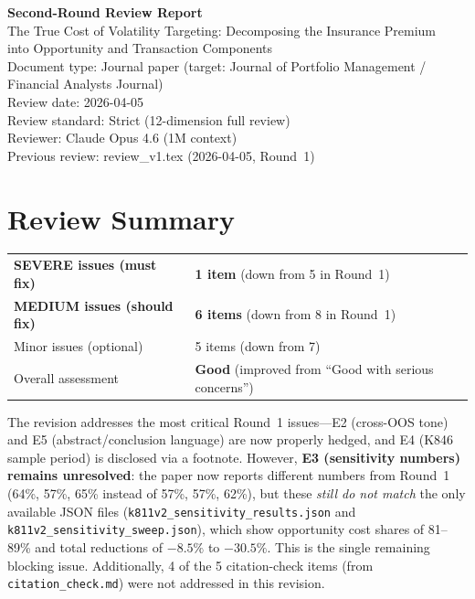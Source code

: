 \documentclass[12pt,a4paper]{article}
\begin{document}
\begin{center}
{\Large\bfseries Second-Round Review Report}\\[0.5em]
{\large The True Cost of Volatility Targeting: Decomposing the Insurance Premium\\into Opportunity and Transaction Components}\\[0.5em]
{\normalsize Document type: Journal paper (target: Journal of Portfolio Management / Financial Analysts Journal)}\\
{\normalsize Review date: 2026-04-05}\\
{\normalsize Review standard: Strict (12-dimension full review)}\\
{\normalsize Reviewer: Claude Opus 4.6 (1M context)}\\[0.3em]
{\normalsize Previous review: review\_v1.tex (2026-04-05, Round~1)}
\end{center}

\bigskip

\section*{Review Summary}

\begin{tabular}{ll}
\textcolor{errorred}{\textbf{SEVERE issues (must fix)}} & \textbf{1 item} (down from 5 in Round~1) \\
\textcolor{warncolor}{\textbf{MEDIUM issues (should fix)}} & \textbf{6 items} (down from 8 in Round~1) \\
Minor issues (optional) & 5 items (down from 7) \\
Overall assessment & \textbf{Good} (improved from ``Good with serious concerns'') \\
\end{tabular}

\bigskip

The revision addresses the most critical Round~1 issues---E2 (cross-OOS tone) and E5 (abstract/conclusion language) are now properly hedged, and E4 (K846 sample period) is disclosed via a footnote. However, \textbf{E3 (sensitivity numbers) remains unresolved}: the paper now reports different numbers from Round~1 (64\%, 57\%, 65\% instead of 57\%, 57\%, 62\%), but these \emph{still do not match} the only available JSON files (\texttt{k811v2\_sensitivity\_results.json} and \texttt{k811v2\_sensitivity\_sweep.json}), which show opportunity cost shares of 81--89\% and total reductions of $-8.5\%$ to $-30.5\%$. This is the single remaining blocking issue. Additionally, 4 of the 5 citation-check items (from \texttt{citation\_check.md}) were not addressed in this revision.
\end{document}
